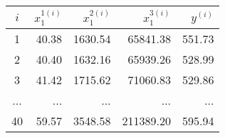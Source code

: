 \begin{tabular}{crrrr}
\toprule
 $i$ & $x_1^{1(i)}$ & $x_1^{2(i)}$ & $x_1^{3(i)}$ & $y^{(i)}$ \\
\midrule
   1 &        40.38 &      1630.54 &     65841.38 &    551.73 \\
   2 &        40.40 &      1632.16 &     65939.26 &    528.99 \\
   3 &        41.42 &      1715.62 &     71060.83 &    529.86 \\
 ... &          ... &          ... &          ... &       ... \\
  40 &        59.57 &      3548.58 &    211389.20 &    595.94 \\
\bottomrule
\end{tabular}
